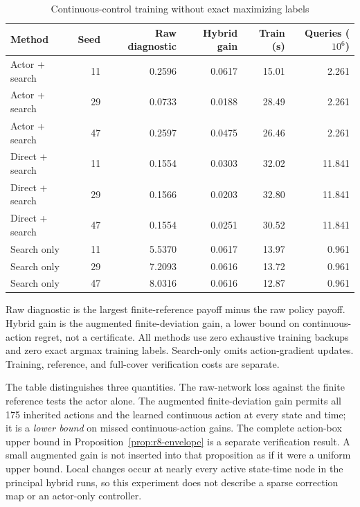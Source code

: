 \documentclass[ecta,nameyear,draft]{econsocart}
\theoremstyle{definition}
\theoremstyle{remark}
\begin{document}
\begin{table}[htbp]\centering
\caption{Continuous-control training without exact maximizing labels}
\begin{small}\begin{tabular}{lrrrrr}
\toprule
Method & Seed & Raw diagnostic & Hybrid gain & Train (s) & Queries ($10^6$) \\
\midrule
Actor + search & 11 & 0.2596 & 0.0617 & 15.01 & 2.261 \\
Actor + search & 29 & 0.0733 & 0.0188 & 28.49 & 2.261 \\
Actor + search & 47 & 0.2597 & 0.0475 & 26.46 & 2.261 \\
Direct + search & 11 & 0.1554 & 0.0303 & 32.02 & 11.841 \\
Direct + search & 29 & 0.1566 & 0.0203 & 32.80 & 11.841 \\
Direct + search & 47 & 0.1554 & 0.0251 & 30.52 & 11.841 \\
Search only & 11 & 5.5370 & 0.0617 & 13.97 & 0.961 \\
Search only & 29 & 7.2093 & 0.0616 & 13.72 & 0.961 \\
Search only & 47 & 8.0316 & 0.0616 & 12.87 & 0.961 \\
\bottomrule\end{tabular}\end{small}
\par\smallskip\begin{minipage}{0.96\linewidth}\footnotesize Raw diagnostic is the largest finite-reference payoff minus the raw policy payoff. Hybrid gain is the augmented finite-deviation gain, a lower bound on continuous-action regret, not a certificate. All methods use zero exhaustive training backups and zero exact argmax training labels. Search-only omits action-gradient updates. Training, reference, and full-cover verification costs are separate.\end{minipage}
\end{table}


The table distinguishes three quantities. The raw-network loss against the finite reference tests the actor alone. The augmented finite-deviation gain permits all 175 inherited actions and the learned continuous action at every state and time; it is a \emph{lower bound} on missed continuous-action gains. The complete action-box upper bound in Proposition~\ref{prop:r8-envelope} is a separate verification result. A small augmented gain is not inserted into that proposition as if it were a uniform upper bound. Local changes occur at nearly every active state-time node in the principal hybrid runs, so this experiment does not describe a sparse correction map or an actor-only controller.
\end{document}
